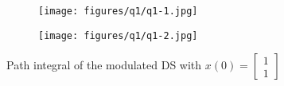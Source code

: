 \begin{figure}[h]
  \centering
  \begin{subfigure}{\textwidth}
    \centering
    \texttt{[image: figures/q1/q1-1.jpg]}
  \end{subfigure}
  \vfill
  \begin{subfigure}{\textwidth}
    \centering
    \texttt{[image: figures/q1/q1-2.jpg]}
  \end{subfigure}
  \caption{Path integral of the modulated DS with \( x(0)=\begin{bmatrix} 1 \\ 1 \end{bmatrix} \)}
\end{figure}
